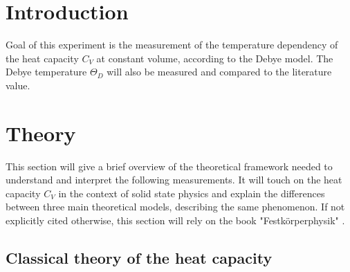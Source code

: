 \section{Introduction}
\label{sec:Zielsetzung}
Goal of this experiment is the measurement of the temperature dependency of the heat capacity $C_V$ at constant volume, according to the Debye model. 
The Debye temperature $\Theta_D$ will also be measured and compared to the literature value.

\section{Theory}
\label{sec:Theorie}
This section will give a brief overview of the theoretical framework needed to understand and interpret the following measurements. It will touch on the heat capacity $C_V$ in the context of solid state physics and explain the differences between three main theoretical models, describing the same phenomenon.
If not explicitly cited otherwise, this section will rely on the book "Festkörperphysik" \cite{rehab}.
\subsection{Classical theory of the heat capacity}

